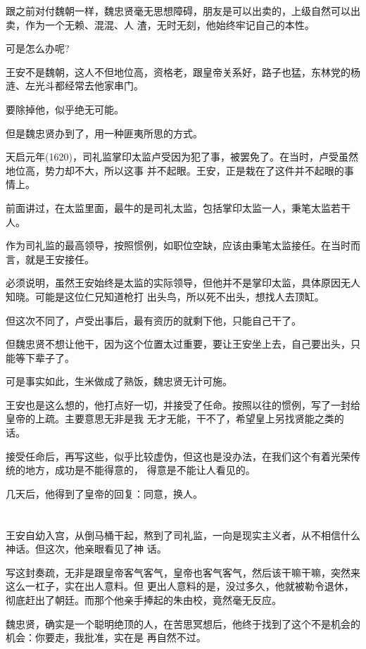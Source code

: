 \documentclass[11pt,a4paper,onecolumn]{article}
\begin{document}
跟之前对付魏朝一样，魏忠贤毫无思想障碍，朋友是可以出卖的，上级自然可以出卖，作为一个无赖、混混、人
渣，无时无刻，他始终牢记自己的本性。

可是怎么办呢?

王安不是魏朝，这人不但地位高，资格老，跟皇帝关系好，路子也猛，东林党的杨涟、左光斗都经常去他家串门。

要除掉他，似乎绝无可能。

但是魏忠贤办到了，用一种匪夷所思的方式。

天启元年(1620)，司礼监掌印太监卢受因为犯了事，被罢免了。在当时，卢受虽然地位高，势力却不大，所以这事
并不起眼。王安，正是栽在了这件并不起眼的事情上。

前面讲过，在太监里面，最牛的是司礼太监，包括掌印太监一人，秉笔太监若干人。

作为司礼监的最高领导，按照惯例，如职位空缺，应该由秉笔太监接任。在当时而言，就是王安接任。

必须说明，虽然王安始终是太监的实际领导，但他并不是掌印太监，具体原因无人知晓。可能是这位仁兄知道枪打
出头鸟，所以死不出头，想找人去顶缸。

但这次不同了，卢受出事后，最有资历的就剩下他，只能自己干了。

但魏忠贤不想让他干，因为这个位置太过重要，要让王安坐上去，自己要出头，只能等下辈子了。

可是事实如此，生米做成了熟饭，魏忠贤无计可施。

王安也是这么想的，他打点好一切，并接受了任命。按照以往的惯例，写了一封给皇帝的上疏。主要意思无非是我
无才无能，干不了，希望皇上另找贤能之类的话。

接受任命后，再写这些，似乎比较虚伪，但这也是没办法，在我们这个有着光荣传统的地方，成功是不能得意的，
得意是不能让人看见的。

几天后，他得到了皇帝的回复：同意，换人。

\section[\thesection]{}

王安自幼入宫，从倒马桶干起，熬到了司礼监，一向是现实主义者，从不相信什么神话。但这次，他亲眼看见了神
话。

写这封奏疏，无非是跟皇帝客气客气，皇帝也客气客气，然后该干嘛干嘛，突然来这么一杠子，实在出人意料。但
更出人意料的是，没过多久，他就被勒令退休，彻底赶出了朝廷。而那个他亲手捧起的朱由校，竟然毫无反应。

魏忠贤，确实是一个聪明绝顶的人，在苦思冥想后，他终于找到了这个不是机会的机会：你要走，我批准，实在是
再自然不过。
\end{document}
